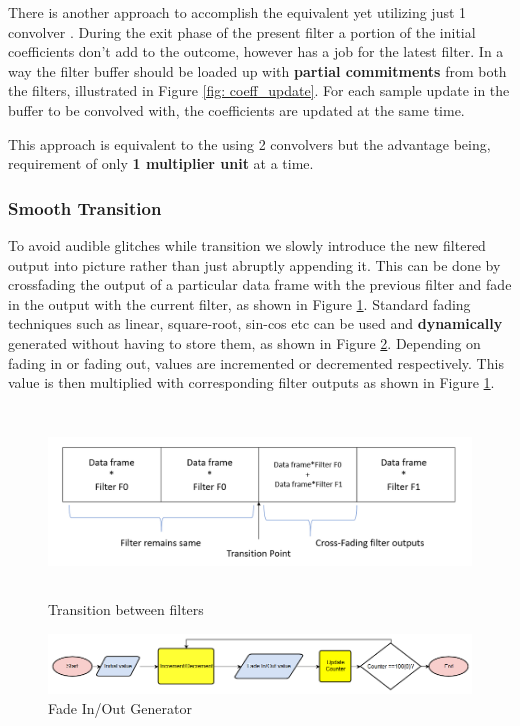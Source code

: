 \documentclass[BTech]{nitkdiss}
\begin{document}
There is another approach to accomplish the equivalent yet utilizing just 1 convolver \cite{live}. During the exit phase of the present filter a portion of the initial coefficients don't add to the outcome, however has a job for the latest filter. In a way the filter buffer should be loaded up with \textbf{partial commitments} from both the filters, illustrated in Figure \ref{fig: coeff_update}.
For each sample update in the buffer to be convolved with, the coefficients are updated at the same time.

This approach is equivalent to the using 2 convolvers but the advantage being, requirement of only \textbf{1 multiplier unit} at a time. 

\subsubsection{Smooth Transition}
To avoid audible glitches while transition we slowly introduce the new filtered output into picture rather than just abruptly appending it. This can be done by crossfading the output of a particular data frame with the previous filter and fade in the output with the current filter, as shown in Figure \ref{fig:crossfade}. Standard fading techniques such as linear, square-root, sin-cos etc can be used and \textbf{dynamically} generated without having to store them, as shown in Figure \ref{fig:fadegen}. Depending on fading in or fading out, values are incremented or decremented respectively. This value is then multiplied with corresponding filter outputs as shown in Figure \ref{fig:crossfade}. 

\begin{figure}
    \centering
    \includegraphics[width = \textwidth, height = 5cm]{Crossfade.png}
    \caption{Transition between filters}
    \label{fig:crossfade}
\end{figure}

\begin{figure}[h!]
    \centering
    \includegraphics[width = \textwidth]{fade_gen.png}
    \caption{Fade In/Out Generator}
    \label{fig:fadegen}
\end{figure}
\end{document}
